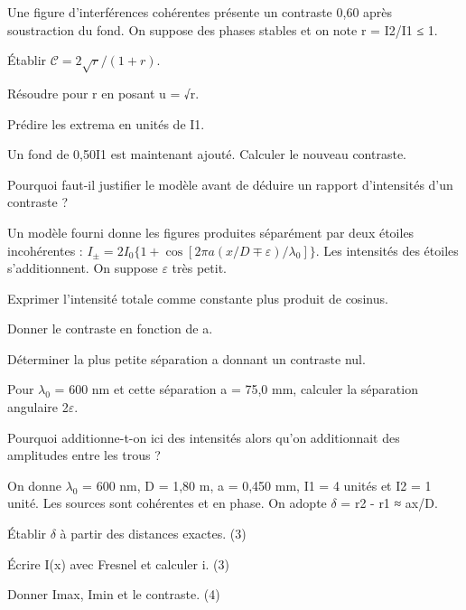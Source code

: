 \label{ch09-ex-D2}
Une figure d’interférences cohérentes présente un contraste 0,60 après soustraction du fond. On suppose des phases stables et on note r = I2/I1 ≤ 1.\begin{questions}
\item Établir $\mathcal C=2\sqrt r/(1+r)$.
\item Résoudre pour r en posant u = √r.
\item Prédire les extrema en unités de I1.
\item Un fond de 0,50I1 est maintenant ajouté. Calculer le nouveau contraste.
\item Pourquoi faut-il justifier le modèle avant de déduire un rapport d’intensités d’un contraste ?
\end{questions}


\label{ch09-ex-D3}
Un modèle fourni donne les figures produites séparément par deux étoiles incohérentes : $I_\pm=2I_0\{1+\cos[2\pi a(x/D\mp\varepsilon)/\lambda_0]\}$. Les intensités des étoiles s’additionnent. On suppose \ensuremath{\varepsilon} très petit.\begin{questions}
\item Exprimer l’intensité totale comme constante plus produit de cosinus.
\item Donner le contraste en fonction de a.
\item Déterminer la plus petite séparation a donnant un contraste nul.
\item Pour \ensuremath{\lambda_0} = 600 nm et cette séparation a = 75,0 mm, calculer la séparation angulaire 2\ensuremath{\varepsilon}.
\item Pourquoi additionne-t-on ici des intensités alors qu’on additionnait des amplitudes entre les trous ?
\end{questions}


On donne \ensuremath{\lambda_0} = 600 nm, D = 1,80 m, a = 0,450 mm, I1 = 4 unités et I2 = 1 unité. Les sources sont cohérentes et en phase. On adopte \ensuremath{\delta} = r2 - r1 ≈ ax/D.
\begin{questions}
\item Établir \ensuremath{\delta} à partir des distances exactes. (3)
\item Écrire I(x) avec Fresnel et calculer i. (3)
\item Donner Imax, Imin et le contraste. (4)
\end{questions}

